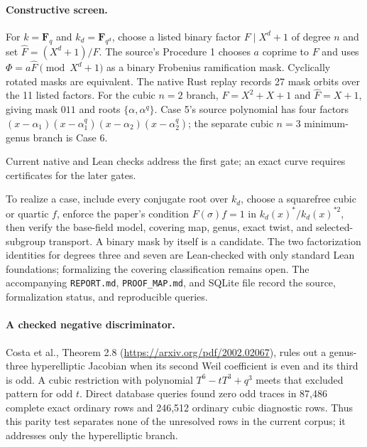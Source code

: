 \documentclass[10pt]{article}
\begin{document}
\paragraph{Constructive screen.}
For $k=\mathbf F_q$ and $k_d=\mathbf F_{q^d}$, choose a listed binary factor
$F\mid X^d+1$ of degree $n$ and set $\widehat F=(X^d+1)/F$. The source's
Procedure 1 chooses $a$ coprime to $F$ and uses
$\Phi=a\widehat F\pmod{X^d+1}$ as a binary Frobenius ramification mask.
Cyclically rotated masks are equivalent. The native Rust replay records 27
mask orbits over the 11 listed factors. For the cubic $n=2$ branch,
$F=X^2+X+1$ and $\widehat F=X+1$, giving mask $011$ and roots
$\{\alpha,\alpha^q\}$. Case 5's source polynomial has four factors
$(x-\alpha_1)(x-\alpha_1^q)(x-\alpha_2)(x-\alpha_2^q)$;
the separate cubic $n=3$ minimum-genus branch is Case 6.

\begin{center}

\small Current native and Lean checks address the first gate; an exact curve
requires certificates for the later gates.
\end{center}

\noindent To realize a case, include every conjugate root over $k_d$, choose
a squarefree cubic or quartic $f$, enforce the paper's condition
$F(\sigma)f=1$ in $k_d(x)^*/k_d(x)^{*2}$, then verify the base-field model,
covering map, genus, exact twist, and selected-subgroup transport. A binary
mask by itself is a candidate. The two factorization identities for degrees
three and seven are Lean-checked with only standard Lean foundations;
formalizing the covering classification remains open. The accompanying
\texttt{REPORT.md}, \texttt{PROOF\_MAP.md}, and SQLite file record the source,
formalization status, and reproducible queries.

\paragraph{A checked negative discriminator.} Costa et al., Theorem 2.8
(\url{https://arxiv.org/pdf/2002.02067}), rules out a genus-three
hyperelliptic Jacobian when its second Weil coefficient is even and its
third is odd. A cubic restriction with polynomial
$T^6-tT^3+q^3$ meets that excluded pattern for odd $t$. Direct database
queries found zero odd traces in 87,486 complete exact ordinary rows and
246,512 ordinary cubic diagnostic rows. Thus this parity test separates none
of the unresolved rows in the current corpus; it addresses only the
hyperelliptic branch.
\end{document}
